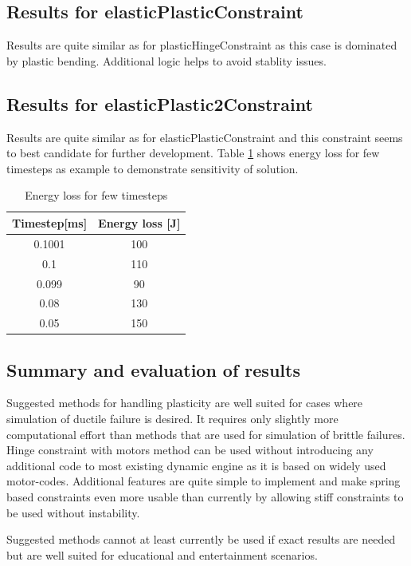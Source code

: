 \subsection{Results for elasticPlasticConstraint}
Results are quite similar as for plasticHingeConstraint as this case is dominated by plastic bending.
Additional logic helps to avoid stablity issues.

\subsection{Results for elasticPlastic2Constraint}
Results are quite similar as for elasticPlasticConstraint and this constraint seems to best candidate for further development.
Table \ref{tab:ep2ts} shows energy loss for few timesteps as example to demonstrate sensitivity of solution.

\begin {table}[htb!]
\begin{center}
\begin{tabular}{| c| c|}
\hline
{\bf Timestep[ms]} & {\bf Energy loss [J]}\\  \hline
 0.1001 &  100 \\ \hline
 0.1 &  110 \\ \hline
 0.099 &  90 \\ \hline
 0.08 &  130 \\ \hline
 0.05 &  150 \\ \hline
\end {tabular}
\end{center}
\caption {Energy loss for few timesteps} \label{tab:ep2ts} 
\end {table}

\subsection{Summary and evaluation of results}
Suggested methods for handling plasticity are well suited for cases where simulation of ductile failure is desired.
It requires only slightly more computational effort than methods that are used for simulation of brittle failures.
Hinge constraint with motors method can be used without introducing any additional code to most existing dynamic engine
as it is based on widely used motor-codes. 
Additional features are quite simple to implement and make spring based constraints even more usable than currently by 
allowing stiff constraints to be used without instability.

Suggested methods cannot at least currently be used if exact results are needed but are well suited for educational and entertainment scenarios.

\cleardoublepage
